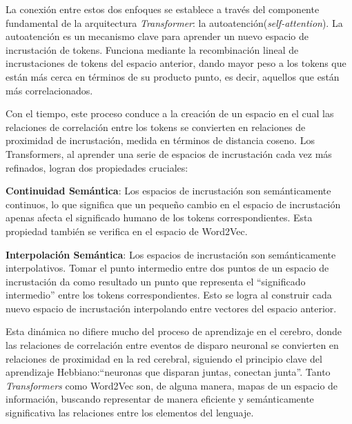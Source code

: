 La conexión entre estos dos enfoques se establece a través del componente fundamental de la arquitectura \textit{Transformer}: la autoatención(\textit{self-attention}). La autoatención es un mecanismo clave para aprender un nuevo espacio de incrustación de tokens. Funciona mediante la recombinación lineal de incrustaciones de tokens del espacio anterior, dando mayor peso a los tokens que están más cerca en términos de su producto punto, es decir, aquellos que están más correlacionados.

Con el tiempo, este proceso conduce a la creación de un espacio en el cual las relaciones de correlación entre los tokens se convierten en relaciones de proximidad de incrustación, medida en términos de distancia coseno. Los Transformers, al aprender una serie de espacios de incrustación cada vez más refinados, logran dos propiedades cruciales:

\begin{description}

\item \textbf{Continuidad Semántica}: Los espacios de incrustación son semánticamente continuos, lo que significa que un pequeño cambio en el espacio de incrustación apenas afecta el significado humano de los tokens correspondientes. Esta propiedad también se verifica en el espacio de Word2Vec.

\item \textbf{Interpolación Semántica}: Los espacios de incrustación son semánticamente interpolativos. Tomar el punto intermedio entre dos puntos de un espacio de incrustación da como resultado un punto que representa el ``significado intermedio'' entre los tokens correspondientes. Esto se logra al construir cada nuevo espacio de incrustación interpolando entre vectores del espacio anterior.

\end{description}

Esta dinámica no difiere mucho del proceso de aprendizaje en el cerebro, donde las relaciones de correlación entre eventos de disparo neuronal se convierten en relaciones de proximidad en la red cerebral, siguiendo el principio clave del aprendizaje Hebbiano:``neuronas que disparan juntas, conectan junta''. Tanto \textit{Transformers} como Word2Vec son, de alguna manera, mapas de un espacio de información, buscando representar de manera eficiente y semánticamente significativa las relaciones entre los elementos del lenguaje.


